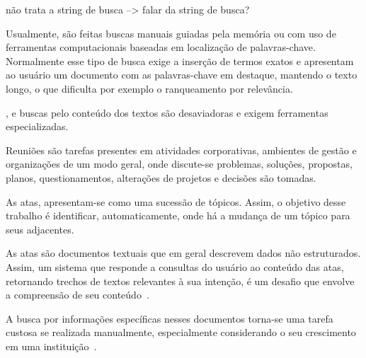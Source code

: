 não trata a string de busca --> falar da string de busca?








Usualmente, são feitas buscas manuais guiadas pela memória ou com uso de ferramentas computacionais baseadas em localização de palavras-chave. Normalmente esse tipo de busca exige a inserção de termos exatos e apresentam ao usuário um documento com as palavras-chave em destaque, mantendo o texto longo, o que dificulta por exemplo o ranqueamento por relevância. 


, e buscas pelo conteúdo dos textos são desaviadoras e exigem ferramentas especializadas.


Reuniões são tarefas presentes em atividades corporativas, ambientes de gestão e organizações de um modo geral, onde discute-se problemas, soluções, propostas, planos, questionamentos, alterações de projetos e decisões são tomadas. 



As atas, apresentam-se como uma sucessão de tópicos. Assim, o objetivo desse trabalho é identificar, automaticamente, onde há a mudança de um tópico para seus adjacentes.




As atas são documentos textuais que em geral descrevem dados não estruturados. Assim, um sistema que responde a consultas do usuário ao conteúdo das atas, retornando trechos de textos relevantes à sua intenção, é um desafio que envolve a compreensão de seu conteúdo~\cite{Bokaei2015}. 



A busca por informações específicas nesses documentos torna-se uma tarefa custosa se realizada manualmente, especialmente considerando o seu crescimento em uma instituição~\cite{Lee2011, Masakazu2013, Miriam2013}.





